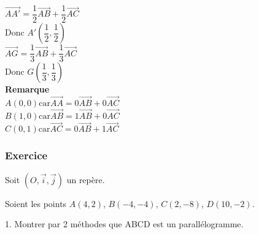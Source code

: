 $\overrightarrow{AA'} = \dfrac{1}{2} \overrightarrow{AB} + \dfrac{1}{2}\overrightarrow{AC}$\\

Donc $A'\left(\dfrac{1}{2}, \dfrac{1}{2}\right)$\\

$\overrightarrow{AG} = \dfrac{1}{3} \overrightarrow{AB} + \dfrac{1}{3}\overrightarrow{AC}$\\

Donc $G\left(\dfrac{1}{3}, \dfrac{1}{3}\right)$\\

\textbf{Remarque}\\

$A\left(0,0\right) \textrm{car} \overrightarrow{AA} = 0\overrightarrow{AB} + 0\overrightarrow{AC}$\\

$B\left(1,0\right) \textrm{car} \overrightarrow{AB} = 1\overrightarrow{AB} + 0\overrightarrow{AC}$\\

$C\left(0,1\right) \textrm{car} \overrightarrow{AC} = 0\overrightarrow{AB} + 1\overrightarrow{AC}$\\

\newpage
\subsubsection{Exercice }

Soit $\left(O,\vec{i}, \vec{j}\right)$ un repère. 

Soient les points $A\left(4,2\right)$, $B\left(-4,-4\right)$, $C\left(2,-8\right)$, $D\left(10,-2\right)$.


1.  Montrer par 2 méthodes que ABCD est un parallélogramme.

